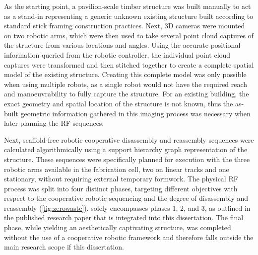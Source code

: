     As the starting point, a pavilion-scale timber structure was built manually to act as a stand-in representing a generic unknown existing structure built according to standard stick framing construction practices. Next, 3D cameras were mounted on two robotic arms, which were then used to take several point cloud captures of the structure from various locations and angles. Using the accurate positional information queried from the robotic controller, the individual point cloud captures were transformed and then stitched together to create a complete spatial model of the existing structure. Creating this complete model was only possible when using multiple robots, as a single robot would not have the required reach and manoeuvrability to fully capture the structure. For an existing building, the exact geometry and spatial location of the structure is not known, thus the as-built geometric information gathered in this imaging process was necessary when later planning the RF sequences.

    Next, scaffold-free robotic cooperative disassembly and reassembly sequences were calculated algorithmically using a support hierarchy graph representation of the structure. These sequences were specifically planned for execution with the three robotic arms available in the fabrication cell, two on linear tracks and one stationary, without requiring external temporary formwork. The physical RF process was split into four distinct phases, targeting different objectives with respect to the cooperative robotic sequencing and the degree of disassembly and reassembly (\cref{fig:zerowaste}).  solely encompasses phases 1, 2, and 3, as outlined in the published research paper that is integrated into this dissertation. The final phase, while yielding an aesthetically captivating structure, was completed without the use of a cooperative robotic framework and therefore falls outside the main research scope if this dissertation.

